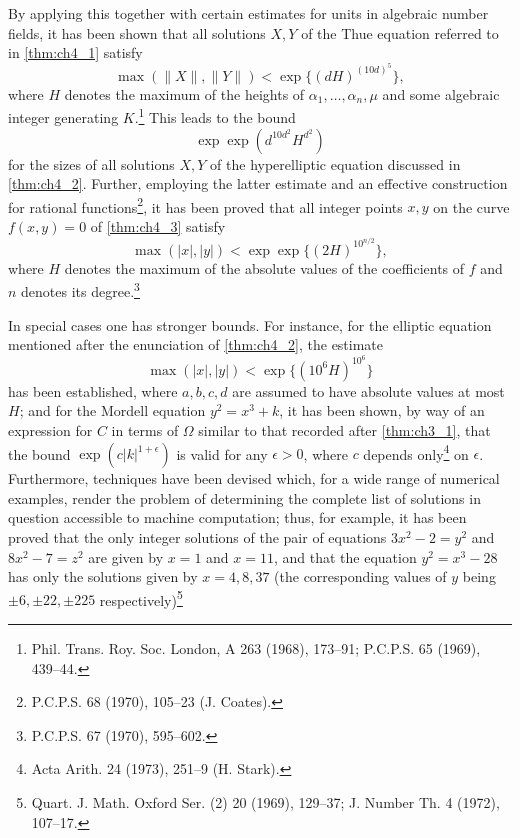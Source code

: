 By applying this together with certain estimates for units in algebraic number fields, it has been shown that all solutions $X, Y$ of the Thue equation referred to in \autoref{thm:ch4_1} satisfy
\[
\max(\|X\|, \|Y\|) < \exp\{(dH)^{(10d)^5}\},
\]
where $H$ denotes the maximum of the heights of $\alpha_1, \dots, \alpha_n, \mu$ and some algebraic integer generating $K$.\footnote{Phil. Trans. Roy. Soc. London, A 263 (1968), 173--91; P.C.P.S. 65 (1969), 439--44.}   This leads to the bound
\[
\exp \exp \left(d^{10d^2}H^{d^2}\right)
\]
for the sizes of all solutions $X, Y$ of the hyperelliptic equation discussed in \autoref{thm:ch4_2}. Further, employing the latter estimate and an effective construction for rational functions\footnote{P.C.P.S. 68 (1970), 105--23 (J. Coates).}, it has been proved that all integer points $x, y$ on the curve $f(x,y) = 0$ of \autoref{thm:ch4_3} satisfy
\[
\max(|x|,|y|) < \exp\exp\{(2H)^{10^{n/2}}\},
\]
where $H$ denotes the maximum of the absolute values of the coefficients of $f$ and $n$ denotes its degree.\footnote{P.C.P.S. 67 (1970), 595--602.}

In special cases one has stronger bounds. For instance, for the elliptic equation mentioned after the enunciation of \autoref{thm:ch4_2}, the estimate
\[
\max (|x|, |y|) < \exp \{(10^6 H)^{10^6}\}
\]
has been established, where $a, b, c, d$ are assumed to have absolute values at most $H$; and for the Mordell equation $y^2 = x^3 + k$, it has been shown, by way of an expression for $C$ in terms of $\Omega$ similar to that recorded after \autoref{thm:ch3_1}, that the bound $\exp(c|k|^{1+\epsilon})$ is valid for any $\epsilon > 0$, where $c$ depends only\footnote{Acta Arith. 24 (1973), 251--9 (H. Stark).} on $\epsilon$. 
Furthermore, techniques have been devised which, for a wide range of numerical examples, render the problem of determining the complete list of solutions in question accessible to machine computation; thus, for example, it has been proved that the only integer solutions of the pair of equations $3x^2-2=y^2$ and $8x^2-7=z^2$ are given by $x=1$ and $x=11$, and that the equation $y^2=x^3-28$ has only the solutions given by $x=4, 8, 37$ (the corresponding values of $y$ being $\pm 6, \pm 22, \pm 225$ respectively)\footnote{Quart. J. Math. Oxford Ser. (2) 20 (1969), 129--37; J. Number Th. 4 (1972), 107--17.}

